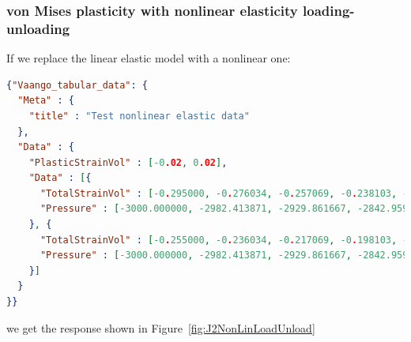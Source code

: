 \subsubsection{von Mises plasticity with nonlinear elasticity loading-unloading} 
If we replace the linear elastic model with a nonlinear one:
\begin{lstlisting}[language=JSON]
{"Vaango_tabular_data": {
  "Meta" : {
    "title" : "Test nonlinear elastic data"
  },
  "Data" : {
    "PlasticStrainVol" : [-0.02, 0.02],
    "Data" : [{
      "TotalStrainVol" : [-0.295000, -0.276034, -0.257069, -0.238103, -0.219138, -0.200172, -0.181207, -0.162241, -0.143276, -0.124310, -0.105345, -0.086379, -0.067414, -0.048448, -0.029483, -0.010517, 0.008448,0.027414, 0.046379, 0.065345, 0.084310, 0.103276, 0.122241, 0.141207, 0.160172, 0.179138, 0.198103, 0.217069, 0.236034, 0.255000],
      "Pressure" : [-3000.000000, -2982.413871, -2929.861667, -2842.959514, -2722.726259, -2570.571529, -2388.279197, -2177.986476, -1942.158854, -1683.561196, -1405.225322, -1110.414466, -802.585016, -485.345990, -162.416726, 162.416726, 485.345990, 802.585016, 1110.414466, 1405.225322, 1683.561196, 1942.158854, 2177.986476, 2388.279197, 2570.571529, 2722.726259, 2842.959514, 2929.861667, 2982.413871, 3000.000000]
    }, {
      "TotalStrainVol" : [-0.255000, -0.236034, -0.217069, -0.198103, -0.179138, -0.160172, -0.141207, -0.122241, -0.103276, -0.084310, -0.065345, -0.046379, -0.027414, -0.008448, 0.010517, 0.029483, 0.048448, 0.067414, 0.086379, 0.105345, 0.124310, 0.143276, 0.162241, 0.181207, 0.200172, 0.219138, 0.238103, 0.257069, 0.276034, 0.295000],
      "Pressure" : [-3000.000000, -2982.413871, -2929.861667, -2842.959514, -2722.726259, -2570.571529, -2388.279197, -2177.986476, -1942.158854, -1683.561196, -1405.225322, -1110.414466, -802.585016, -485.345990, -162.416726, 162.416726, 485.345990, 802.585016, 1110.414466, 1405.225322, 1683.561196, 1942.158854, 2177.986476, 2388.279197, 2570.571529, 2722.726259, 2842.959514, 2929.861667, 2982.413871, 3000.000000]
    }]
  }
}}
\end{lstlisting}
we get the response shown in Figure~\ref{fig:J2NonLinLoadUnload}
